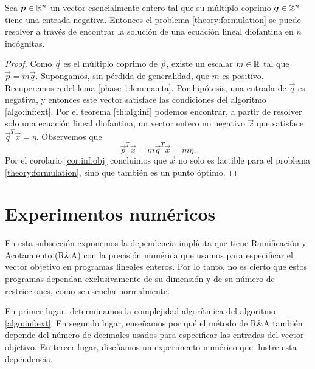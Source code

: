 \begin{theorem}
	\label{infinite:th:complexity}
	Sea $\boldsymbol{p} \in \mathbb{R}^n$ un vector esencialmente entero tal que su múltiplo coprimo $\boldsymbol{q} \in
	\mathbb{Z}^n$ tiene una entrada negativa. Entonces el problema \eqref{theory:formulation} se puede
	resolver a través de encontrar la solución de una ecuación lineal diofantina en $n$ incógnitas.
\end{theorem}
\begin{proof}
	Como $\vec{q}$ es el múltiplo coprimo de $\vec{p}$, existe un escalar $m \in \mathbb{R}$ tal que
	$\vec{p} = m\vec{q}$. Supongamos, sin pérdida de generalidad, que $m$ es positivo. Recuperemos
	$\eta$ del lema \ref{phase-1:lemma:eta}. Por hipótesis, una entrada de $\vec{q}$ es negativa, y
	entonces este vector satisface las condiciones del algoritmo \ref{algo:inf:ext}. Por el teorema
	\ref{th:alg:inf} podemos encontrar, a partir de resolver solo una ecuación lineal diofantina, un
	vector entero no negativo $\vec{x}$ que satisface $\vec{q}^T\vec{x} = \eta$. Observemos que
	\begin{equation*}
		\vec{p}^T\vec{x} = m\vec{q}^T\vec{x} = m\eta.
	\end{equation*}
	Por el corolario \ref{cor:inf:obj} concluimos que $\vec{x}$ no solo es factible para el problema
	\eqref{theory:formulation}, sino que también es un punto óptimo.
\end{proof}

\section{Experimentos numéricos}
\label{sec:inf:exp}
\noindent
En esta subsección exponemos la dependencia implícita que tiene Ramificación y Acotamiento (R\&A)
con la precisión numérica que usamos para especificar el vector objetivo en programas lineales
enteros. Por lo tanto, no es cierto que estos programas dependan exclusivamente de su dimensión y de
su número de restricciones, como se escucha normalmente.

En primer lugar, determinamos la complejidad algorítmica del algoritmo \ref{algo:inf:ext}. En
segundo lugar, enseñamos por qué el método de R\&A también depende del número de decimales usados
para especificar las entradas del vector objetivo. En tercer lugar, diseñamos un experimento
numérico que ilustre esta dependencia.

